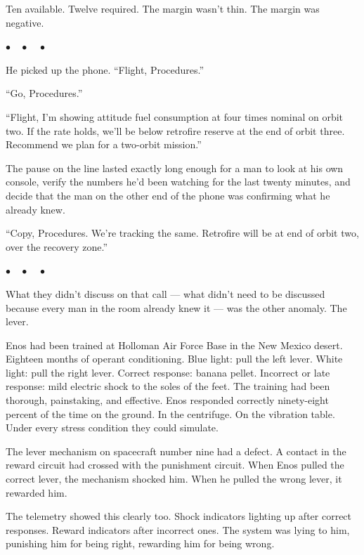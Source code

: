 \documentclass[12pt, letterpaper]{article}
\begin{document}
Ten available. Twelve required. The margin wasn't thin. The margin was negative.

\begin{center}
$\bullet\quad\bullet\quad\bullet$
\end{center}

He picked up the phone. ``Flight, Procedures.''

``Go, Procedures.''

``Flight, I'm showing attitude fuel consumption at four times nominal on orbit two. If the rate holds, we'll be below retrofire reserve at the end of orbit three. Recommend we plan for a two-orbit mission.''

The pause on the line lasted exactly long enough for a man to look at his own console, verify the numbers he'd been watching for the last twenty minutes, and decide that the man on the other end of the phone was confirming what he already knew.

``Copy, Procedures. We're tracking the same. Retrofire will be at end of orbit two, over the recovery zone.''

\begin{center}
$\bullet\quad\bullet\quad\bullet$
\end{center}

What they didn't discuss on that call --- what didn't need to be discussed because every man in the room already knew it --- was the other anomaly. The lever.

Enos had been trained at Holloman Air Force Base in the New Mexico desert. Eighteen months of operant conditioning. Blue light: pull the left lever. White light: pull the right lever. Correct response: banana pellet. Incorrect or late response: mild electric shock to the soles of the feet. The training had been thorough, painstaking, and effective. Enos responded correctly ninety-eight percent of the time on the ground. In the centrifuge. On the vibration table. Under every stress condition they could simulate.

The lever mechanism on spacecraft number nine had a defect. A contact in the reward circuit had crossed with the punishment circuit. When Enos pulled the correct lever, the mechanism shocked him. When he pulled the wrong lever, it rewarded him.

The telemetry showed this clearly too. Shock indicators lighting up after correct responses. Reward indicators after incorrect ones. The system was lying to him, punishing him for being right, rewarding him for being wrong.
\end{document}
